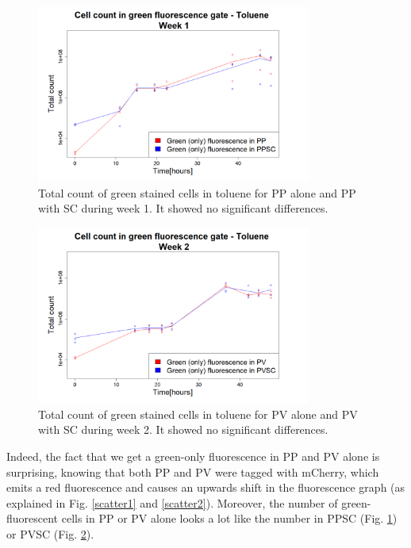 \documentclass[a4paper, 10pt, conference]{ieeeconf}   %
\begin{document}
\begin{figure}
	 
	
		\centering
		\includegraphics[width=9cm]{problemw1.PNG}
		\caption{Total count of green stained cells in toluene for PP alone and PP with SC during week 1. It showed no significant differences.}
		\label{problemw1}
\end{figure}

\begin{figure}
		\centering
		\includegraphics[width=9cm]{problemw2.PNG}
		\caption{Total count of green stained cells in toluene for PV alone and PV with SC during week 2. It showed no significant differences.}
		\label{problemw2}

  
\end{figure}

 Indeed, the fact that we get a green-only fluorescence in PP and PV alone is surprising, knowing that both PP and PV were tagged with mCherry, which emits a red fluorescence and causes an upwards shift in the fluorescence graph (as explained in Fig. \ref{scatter1} and \ref{scatter2}). Moreover, the number of green-fluorescent cells in PP or PV alone looks a lot like the number in PPSC (Fig. \ref{problemw1}) or PVSC (Fig. \ref{problemw2}).
 
\end{document}
